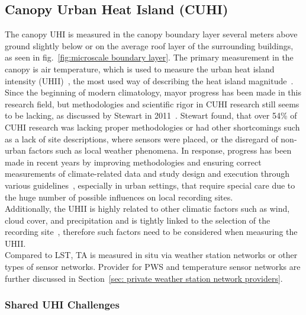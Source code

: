 \subsection{Canopy Urban Heat Island (CUHI)}

The canopy UHI is measured in the canopy boundary layer several meters above ground slightly below or on the average roof layer of the surrounding buildings, as seen in fig.~\ref{fig:microscale boundary layer}. The primary measurement in the canopy is air temperature, which is used to measure the urban heat island intensity (UHII)~\cite{oke1973city}, the most used way of describing the heat island magnitude~\cite{kim2021urban}.\\
Since the beginning of modern climatology, mayor progress has been made in this research field, but methodologies and scientific rigor in CUHI research still seems to be lacking, as discussed by Stewart in 2011~\cite{stewart2011systematic}. Stewart found, that over 54\% of CUHI research was lacking proper methodologies or had other shortcomings such as a lack of site descriptions, where sensors were placed, or the disregard of non-urban factors such as local weather phenomena. In response, progress has been made in recent years by improving methodologies and ensuring correct measurements of climate-related data and study design and execution through various guidelines~\cite{oke2006guideline}, especially in urban settings, that require special care due to the huge number of possible influences on local recording sites.\\
Additionally, the UHII is highly related to other climatic factors such as wind, cloud cover, and precipitation and is tightly linked to the selection of the recording site~\cite{fenner2019contrasting}, therefore such factors need to be considered when measuring the UHII.\\
Compared to LST, TA is measured in situ via weather station networks or other types of sensor networks. Provider for PWS and temperature sensor networks are further discussed in Section~\ref{sec: private weather station network providers}.

\subsubsection{Shared UHI Challenges}

